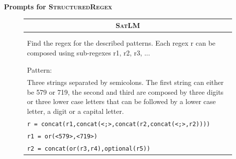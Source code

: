\documentclass{article}
\theoremstyle{definition}
\newcommand{\satlm}{\textsc{SatLM}}
\begin{document}
\newpage
\textbf{Prompts for \textsc{StructuredRegex}}
\begin{figure}[h]
    \footnotesize
    \centering
    \begin{tabularx}{\linewidth}{X}
    \toprule
            \multicolumn{1}{c}{\textbf{\satlm{}} } \\
         \midrule
\\
\\
Find the regex for the described patterns. Each regex r can be composed using sub-regexes r1, r2, r3, ... \\
\\
\\
Pattern:\\
Three strings separated by semicolons. The first string can either be 579 or 719, the second and third are composed by three digits or three lower case letters that can be followed by a lower case letter, a digit or a capital letter.\\
\tt r = concat(r1,concat(<;>,concat(r2,concat(<;>,r2)))) \\
\tt r1 = or(<579>,<719>) \\
\tt r2 = concat(or(r3,r4),optional(r5)) \\

\end{tabularx}
\end{figure}
\end{document}
